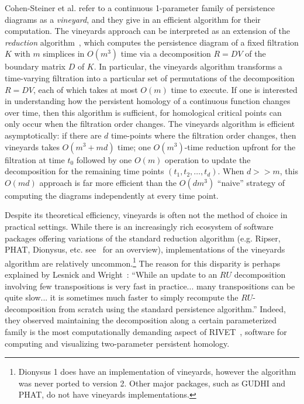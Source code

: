 \documentclass[sn-mathphys]{sn-jnl}
\begin{document}
Cohen-Steiner et al. refer to a continuous 1-parameter family of persistence diagrams as a \emph{vineyard}, and they give in \cite{cohen2006vines} an efficient algorithm for their computation. 
The vineyards approach can be interpreted as an extension of the \emph{reduction} algorithm~\cite{zomorodian2005computing}, which computes the persistence diagram of a fixed filtration $K$ with $m$ simplices in $O(m^3)$ time via a decomposition $R = D V$ of the boundary matrix $D$ of $K$.
In particular, the vineyards algorithm transforms a time-varying filtration into a particular set of permutations of the decomposition $R = DV$, each of which takes at most $O(m)$ time to execute. If one is interested in understanding how the persistent homology of a continuous function changes over time, then this algorithm is sufficient, for homological critical points can only occur when the filtration order changes. 
The vineyards algorithm is efficient asymptotically: if there are $d$ time-points where the filtration order changes, then  vineyards   takes $O(m^3 + md)$ time; one $O(m^3)$-time reduction upfront for the filtration at time $t_0$ followed by one $O(m)$ operation to update the decomposition for the remaining time points $(t_1, t_2, \dots, t_d)$. When $d >> m$, this $O(md)$ approach is far more efficient than the $O(dm^3)$  ``naive'' strategy of computing the diagrams independently at every time point.

Despite its theoretical efficiency, vineyards is often not the method of choice in practical settings. 
While there is an increasingly rich ecosystem of software packages offering variations of the standard reduction algorithm (e.g. Ripser, PHAT, Dionysus, etc. see~\cite{otter2017roadmap} for an overview), implementations of the vineyards algorithm are relatively uncommon.\footnote{Dionysus 1 does have an implementation of vineyards, however the algorithm was never ported to version 2. Other major packages, such as GUDHI and PHAT, do not have vineyards implementations.} 
The reason for this disparity is perhaps explained by Lesnick and Wright~\cite{lesnick2015interactive}: ``While an update to an $RU$ decomposition involving few transpositions is very fast in practice... many transpositions can be quite slow... it is sometimes much faster to simply recompute the $RU$-decomposition from scratch using the standard persistence algorithm.'' Indeed, they observed maintaining the decomposition along a certain parameterized family is the most computationally demanding aspect of RIVET~\cite{rivet}, software for computing and visualizing	 two-parameter persistent homology.
\end{document}
